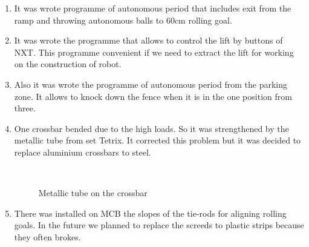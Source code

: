 \begin{enumerate}
	\item It was wrote programme of autonomous period that includes exit from the ramp and throwing autonomous balls to 60cm rolling goal.
	
	\item It was wrote the programme that allows to control the lift by buttons of NXT. This programme convenient if we need to extract the lift for working on the construction of robot.
	
	\item Also it was wrote the programme of autonomous period from the parking zone. It allows to knock down the fence when it is in the one position from three.
	
	\item One crossbar bended due to the high loads. So it was strengthened by the metallic tube from set Tetrix. It corrected this problem but it was decided to replace aluminium crossbars to steel.
	
	\begin{figure}[H]
		\begin{minipage}[h]{0.2\linewidth}
			\center  
		\end{minipage}
		\begin{minipage}[h]{0.6\linewidth}
			\caption{Metallic tube on the crossbar}
		\end{minipage}
	\end{figure}
	
	\item There was installed on MCB the slopes of the tie-rods for aligning rolling goals. In the future we planned to replace the screeds  to plastic strips because they often brokes.
	

\end{enumerate}
